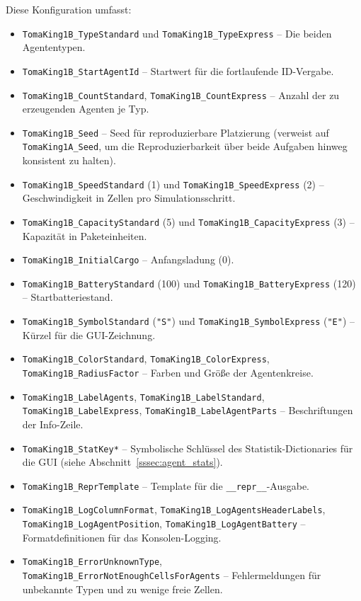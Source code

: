 Diese Konfiguration umfasst:
\begin{itemize}
    \item \texttt{TomaKing1B\_TypeStandard} und \texttt{TomaKing1B\_TypeExpress} – Die beiden Agententypen.
    \item \texttt{TomaKing1B\_StartAgentId} – Startwert für die fortlaufende ID-Vergabe.
    \item \texttt{TomaKing1B\_CountStandard}, \texttt{TomaKing1B\_CountExpress} – Anzahl der zu erzeugenden Agenten je Typ.
    \item \texttt{TomaKing1B\_Seed} – Seed für reproduzierbare Platzierung (verweist auf \texttt{TomaKing1A\_Seed}, um die Reproduzierbarkeit über beide Aufgaben hinweg konsistent zu halten).
    \item \texttt{TomaKing1B\_SpeedStandard} (1) und \texttt{TomaKing1B\_SpeedExpress} (2) – Geschwindigkeit in Zellen pro Simulationsschritt.
    \item \texttt{TomaKing1B\_CapacityStandard} (5) und \texttt{TomaKing1B\_CapacityExpress} (3) – Kapazität in Paketeinheiten.
    \item \texttt{TomaKing1B\_InitialCargo} – Anfangsladung (0).
    \item \texttt{TomaKing1B\_BatteryStandard} (100) und \texttt{TomaKing1B\_BatteryExpress} (120) – Startbatteriestand.
    \item \texttt{TomaKing1B\_SymbolStandard} (\texttt{"S"}) und \texttt{TomaKing1B\_SymbolExpress} (\texttt{"E"}) – Kürzel für die \acs{GUI}-Zeichnung.
    \item \texttt{TomaKing1B\_ColorStandard}, \texttt{TomaKing1B\_ColorExpress}, \texttt{TomaKing1B\_RadiusFactor} – Farben und Größe der Agentenkreise.
    \item \texttt{TomaKing1B\_LabelAgents}, \texttt{TomaKing1B\_LabelStandard}, \texttt{TomaKing1B\_LabelExpress}, \texttt{TomaKing1B\_LabelAgentParts} – Beschriftungen der Info-Zeile.
    \item \texttt{TomaKing1B\_StatKey*} – Symbolische Schlüssel des Statistik-Dictionaries für die \acs{GUI} (siehe Abschnitt~\ref{sssec:agent_stats}).
    \item \texttt{TomaKing1B\_ReprTemplate} – Template für die \texttt{\_\_repr\_\_}-Ausgabe.
    \item \texttt{TomaKing1B\_LogColumnFormat}, \texttt{TomaKing1B\_LogAgentsHeaderLabels}, \\ \texttt{TomaKing1B\_LogAgentPosition}, \texttt{TomaKing1B\_LogAgentBattery} – Formatdefinitionen für das Konsolen-Logging.
    \item \texttt{TomaKing1B\_ErrorUnknownType}, \texttt{TomaKing1B\_ErrorNotEnoughCellsForAgents} – Fehlermeldungen für unbekannte Typen und zu wenige freie Zellen.
\end{itemize}

